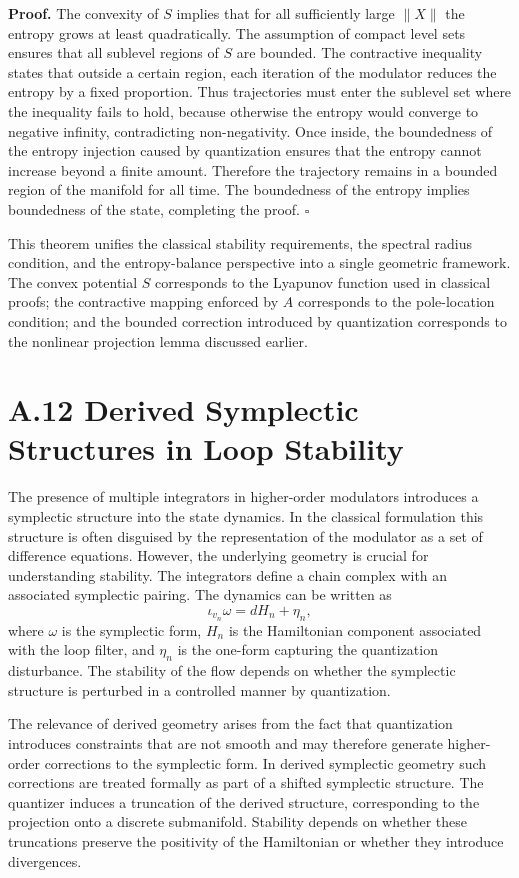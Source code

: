 \medskip

\textbf{Proof.}
The convexity of \(S\) implies that for all sufficiently large \(\|X\|\) the entropy grows at least quadratically. The assumption of compact level sets ensures that all sublevel regions of \(S\) are bounded. The contractive inequality states that outside a certain region, each iteration of the modulator reduces the entropy by a fixed proportion. Thus trajectories must enter the sublevel set where the inequality fails to hold, because otherwise the entropy would converge to negative infinity, contradicting non-negativity. Once inside, the boundedness of the entropy injection caused by quantization ensures that the entropy cannot increase beyond a finite amount. Therefore the trajectory remains in a bounded region of the manifold for all time. The boundedness of the entropy implies boundedness of the state, completing the proof. \(\square\)

\medskip

This theorem unifies the classical stability requirements, the spectral radius condition, and the entropy-balance perspective into a single geometric framework. The convex potential \(S\) corresponds to the Lyapunov function used in classical proofs; the contractive mapping enforced by \(A\) corresponds to the pole-location condition; and the bounded correction introduced by quantization corresponds to the nonlinear projection lemma discussed earlier.

\section{A.12 Derived Symplectic Structures in Loop Stability}

The presence of multiple integrators in higher-order modulators introduces a symplectic structure into the state dynamics. In the classical formulation this structure is often disguised by the representation of the modulator as a set of difference equations. However, the underlying geometry is crucial for understanding stability. The integrators define a chain complex with an associated symplectic pairing. The dynamics can be written as
\[
\iota_{v_n} \omega = dH_n + \eta_n,
\]
where \(\omega\) is the symplectic form, \(H_n\) is the Hamiltonian component associated with the loop filter, and \(\eta_n\) is the one-form capturing the quantization disturbance. The stability of the flow depends on whether the symplectic structure is perturbed in a controlled manner by quantization.

The relevance of derived geometry arises from the fact that quantization introduces constraints that are not smooth and may therefore generate higher-order corrections to the symplectic form. In derived symplectic geometry such corrections are treated formally as part of a shifted symplectic structure. The quantizer induces a truncation of the derived structure, corresponding to the projection onto a discrete submanifold. Stability depends on whether these truncations preserve the positivity of the Hamiltonian or whether they introduce divergences.

